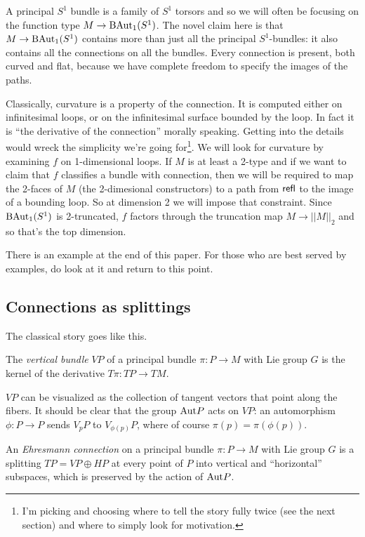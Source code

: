 A principal \(S^1\) bundle is a family of \(S^1\) torsors and so we will
often be focusing on the function type \(M\to \mathrm{BAut}_1(S^1)\). The novel
claim here is that \(M\to \mathrm{BAut}_1(S^1)\) contains more than just all the
principal \(S^1\)-bundles: it also contains all the connections on all
the bundles. Every connection is present, both curved and flat, because
we have complete freedom to specify the images of the paths.

Classically, curvature is a property of the connection. It is computed
either on infinitesimal loops, or on the infinitesimal surface bounded
by the loop. In fact it is ``the derivative of the connection'' morally
speaking. Getting into the details would wreck the simplicity we're
going for\footnote{I'm picking and choosing where to tell the story
  fully twice (see the next section) and where to simply look for
  motivation.}. We will look for curvature by examining \(f\) on
1-dimensional loops. If \(M\) is at least a 2-type and if we want to
claim that \(f\) classifies a bundle with connection, then we will be
required to map the 2-faces of \(M\) (the 2-dimesional constructors) to
a path from \(\mathsf{refl}\) to the image of a bounding loop. So at dimension 2
we will impose that constraint. Since \(\mathrm{BAut}_1(S^1)\) is 2-truncated, \(f\)
factors through the truncation map \(M\to||M||_2\) and so that's the top
dimension.

There is an example at the end of this paper. For those who are best
served by examples, do look at it and return to this point.

\subsection{Connections as splittings}\label{connections-as-splittings}

The classical story goes like this.

\begin{mydef}
The \emph{vertical bundle} \( VP \) of a principal bundle \( \pi:P\to M \) with Lie group \( G \) is the kernel of the derivative \( T\pi:TP\to TM \). 
\end{mydef}

\(VP\) can be visualized as the collection of tangent vectors that point
along the fibers. It should be clear that the group \(\mathrm{Aut} P\) acts on
\(VP\): an automorphism \(\phi:P\to P\) sends \(V_pP\) to
\(V_{\phi(p)}P\), where of course \(\pi(p)=\pi(\phi(p))\).

\begin{mydef}
An \emph{Ehresmann connection} on a principal bundle \( \pi:P\to M \) with Lie group \( G \) is a splitting \( TP=VP\oplus HP \) at every point of \( P \) into vertical and ``horizontal'' subspaces, which is preserved by the action of \( \mathrm{Aut} P \).
\end{mydef}

